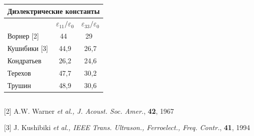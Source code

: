 \documentclass{beamer}
\begin{document}
{{\begin{columns}
\begin{table}
\begin{tabular}{l c c}
        \multicolumn{3}{c}{Диэлектрические константы} \\
        \hline 
        & $\varepsilon_{11}/\varepsilon_{0}$ & $\varepsilon_{33}/\varepsilon_{0}$  \\
        \hline
        Ворнер [2] & 44$~~$ & 29$~~$  \\
        Кушибики [3] & 44,9 & 26,7   \\
        Кондратьев & 26,2 & 24,6 \\
        Терехов  & 47,7 & 30,2   \\
        Трушин & 48,9 & 30,6   \\
        \hline
      \end{tabular}
    \end{table}
  \end{columns}

    [2] A.W. Warner {\it{et al.}, J. Acoust. Soc. Amer.}, \textbf{42}, 1967
            
    \vspace*{-0.1cm}
    [3] J. Kushibiki {\it{et al.}, IEEE Trans. Ultrason., Ferroelect., Freq. Contr.}, \textbf{41}, 1994
    \vspace*{\baselineskip}
}
}




\end{document}

